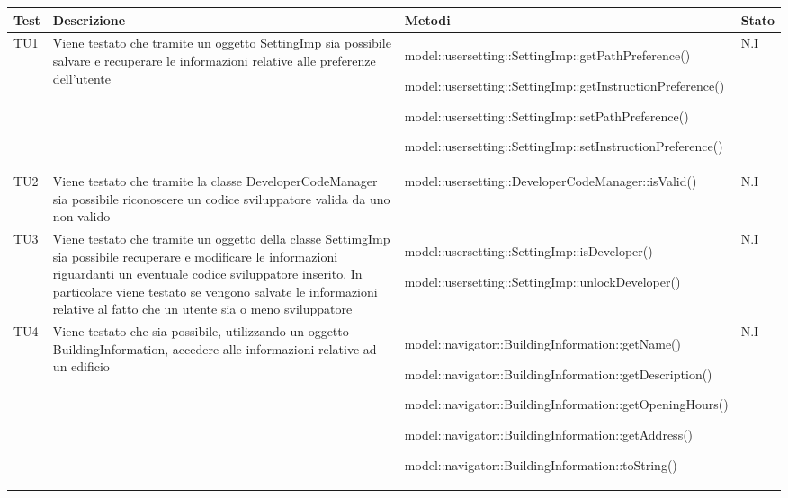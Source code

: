 \documentclass[../PianoDiQualifica.tex]{subfiles}
\begin{document}
\begin{appendices}
	\begin{longtabu} to \textwidth {X X X X}
\toprule
\textbf{Test} & \textbf{Descrizione} & \textbf{Metodi} & \textbf{Stato}\\
\midrule
\endhead
{}
TU1 & Viene testato che tramite un oggetto SettingImp sia possibile salvare e recuperare le informazioni relative alle preferenze dell'utente & model::usersetting::SettingImp::getPathPreference() \par model::usersetting::SettingImp::getInstructionPreference() \par model::usersetting::SettingImp::setPathPreference() \par model::usersetting::SettingImp::setInstructionPreference() & N.I \\ 
\midrule 
TU2 & Viene testato che tramite la classe DeveloperCodeManager sia possibile riconoscere un codice sviluppatore valida da uno non valido & model::usersetting::DeveloperCodeManager::isValid() & N.I \\ 
\midrule 
TU3 & Viene testato che tramite un oggetto della classe SettimgImp sia possibile recuperare e modificare le informazioni riguardanti un eventuale codice sviluppatore inserito. In particolare viene testato se vengono salvate le informazioni relative al fatto che un utente sia o meno sviluppatore & model::usersetting::SettingImp::isDeveloper() \par model::usersetting::SettingImp::unlockDeveloper() & N.I \\ 
\midrule 
TU4 & Viene testato che sia possibile, utilizzando un oggetto BuildingInformation, accedere alle informazioni relative ad un edificio & model::navigator::BuildingInformation::getName() \par model::navigator::BuildingInformation::getDescription() \par model::navigator::BuildingInformation::getOpeningHours() \par model::navigator::BuildingInformation::getAddress() \par model::navigator::BuildingInformation::toString() & N.I \\ 
\midrule 

\end{longtabu}
\end{appendices}
\end{document}
